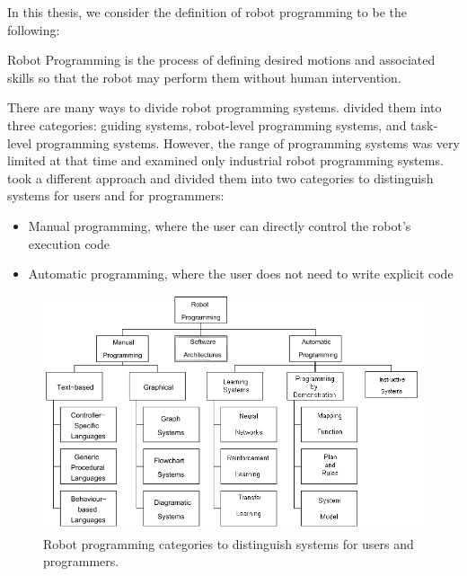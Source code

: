 In this thesis, we consider the definition of robot programming to be the following: 

\theoremstyle{definition}
\begin{definition}{Robot Programming}
is the process of defining desired motions and associated skills so that the robot may perform them without human intervention.
\end{definition}

There are many ways to divide robot programming systems. \cite{lozano1983robot} divided them into three categories: guiding systems, robot-level programming systems, and task-level programming systems. However, the range of programming systems was very limited at that time and examined only industrial robot programming systems.
\cite{Biggs2003} took a different approach and divided them into two categories to distinguish systems for users and for programmers:

\begin{itemize}
    \item Manual programming, where the user can directly control the robot's execution code 
    \item Automatic programming, where the user does not need to write explicit code
\end{itemize}

 \begin{figure}[ht]
  \centering
\includegraphics[width=\linewidth]{figures/Biggs2003-RobotProgramming}
  \caption{Robot programming categories to distinguish systems for users and programmers. \cite{Biggs2003}}
  \label{fig:RobotProgrammingSystems}
\end{figure} 

